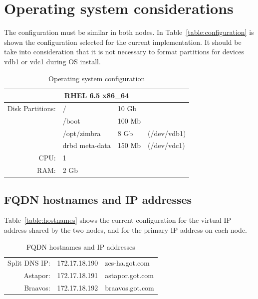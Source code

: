 \documentclass[a4paper, 12pt]{book}
\begin{document}
\section{Operating system considerations}
\label{sec:considerations}

The configuration must be similar in both nodes. In Table~\ref{table:configuration} is shown the configuration selected for the current implementation. It should be take into consideration that it is not necessary to format partitions for devices vdb1 or vdc1 during OS install.


\begin{table}
  \centering
  \begin{tabular}{ | r l l l | }
  
    \hline    
    \multicolumn{4}{|c|}{\textbf{RHEL 6.5 x86\_64}}\\
    \hline
    Disk Partitions: & /              & 10 Gb  & \\
                     & /boot          & 100 Mb & \\
                     & /opt/zimbra    & 8 Gb   & (/dev/vdb1)\\
                     & drbd meta-data & 150 Mb & (/dev/vdc1)\\
    CPU:             & 1              &        & \\
    RAM:			 & 2 Gb 		  &        & \\
    \hline
  \end{tabular}
\caption{Operating system configuration}
\label{table:os}
\end{table}


\subsection{FQDN hostnames and IP addresses}
\label{sec:fqdn}

Table~\ref{table:hostnames} shows the current configuration for the virtual IP address shared by the two nodes, and for the primary IP address on each node.\\

\begin{table}
  \centering
  \begin{tabular}{ | r c l | }
    \hline    
    Split DNS IP: & 172.17.18.190 & zcs-ha.got.com \\
	Astapor:      & 172.17.18.191 & astapor.got.com \\
	Braavos:      & 172.17.18.192 & braavos.got.com \\
    \hline
  \end{tabular}
\caption{FQDN hostnames and IP addresses}
\label{table:fqdn}
\end{table}
\end{document}
